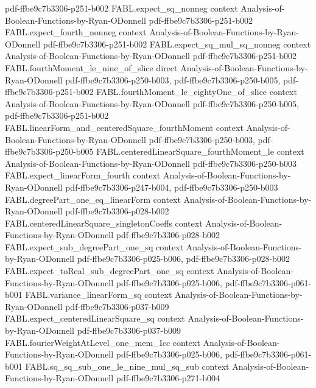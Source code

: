 \begin{theorem}
  {pdf-ffbe9c7b3306-p251-b002}
\proofstep
  {FABL.expect_sq_nonneg}
  {context}
  {Analysis-of-Boolean-Functions-by-Ryan-ODonnell}
  {pdf-ffbe9c7b3306-p251-b002}
\proofstep
  {FABL.expect_fourth_nonneg}
  {context}
  {Analysis-of-Boolean-Functions-by-Ryan-ODonnell}
  {pdf-ffbe9c7b3306-p251-b002}
\proofstep
  {FABL.expect_sq_mul_sq_nonneg}
  {context}
  {Analysis-of-Boolean-Functions-by-Ryan-ODonnell}
  {pdf-ffbe9c7b3306-p251-b002}
\proofstep
  {FABL.fourthMoment_le_nine_of_slice}
  {direct}
  {Analysis-of-Boolean-Functions-by-Ryan-ODonnell}
  {pdf-ffbe9c7b3306-p250-b003,
    pdf-ffbe9c7b3306-p250-b005,
    pdf-ffbe9c7b3306-p251-b002}
\proofstep
  {FABL.fourthMoment_le_eightyOne_of_slice}
  {context}
  {Analysis-of-Boolean-Functions-by-Ryan-ODonnell}
  {pdf-ffbe9c7b3306-p250-b005,
    pdf-ffbe9c7b3306-p251-b002}
\proofstep
  {FABL.linearForm_and_centeredSquare_fourthMoment}
  {context}
  {Analysis-of-Boolean-Functions-by-Ryan-ODonnell}
  {pdf-ffbe9c7b3306-p250-b003,
    pdf-ffbe9c7b3306-p250-b005}
\proofstep
  {FABL.centeredLinearSquare_fourthMoment_le}
  {context}
  {Analysis-of-Boolean-Functions-by-Ryan-ODonnell}
  {pdf-ffbe9c7b3306-p250-b003}
\proofstep
  {FABL.expect_linearForm_fourth}
  {context}
  {Analysis-of-Boolean-Functions-by-Ryan-ODonnell}
  {pdf-ffbe9c7b3306-p247-b004,
    pdf-ffbe9c7b3306-p250-b003}
\proofstep
  {FABL.degreePart_one_eq_linearForm}
  {context}
  {Analysis-of-Boolean-Functions-by-Ryan-ODonnell}
  {pdf-ffbe9c7b3306-p028-b002}
\proofstep
  {FABL.centeredLinearSquare_singletonCoeffs}
  {context}
  {Analysis-of-Boolean-Functions-by-Ryan-ODonnell}
  {pdf-ffbe9c7b3306-p028-b002}
\proofstep
  {FABL.expect_sub_degreePart_one_sq}
  {context}
  {Analysis-of-Boolean-Functions-by-Ryan-ODonnell}
  {pdf-ffbe9c7b3306-p025-b006,
    pdf-ffbe9c7b3306-p028-b002}
\proofstep
  {FABL.expect_toReal_sub_degreePart_one_sq}
  {context}
  {Analysis-of-Boolean-Functions-by-Ryan-ODonnell}
  {pdf-ffbe9c7b3306-p025-b006,
    pdf-ffbe9c7b3306-p061-b001}
\proofstep
  {FABL.variance_linearForm_sq}
  {context}
  {Analysis-of-Boolean-Functions-by-Ryan-ODonnell}
  {pdf-ffbe9c7b3306-p037-b009}
\proofstep
  {FABL.expect_centeredLinearSquare_sq}
  {context}
  {Analysis-of-Boolean-Functions-by-Ryan-ODonnell}
  {pdf-ffbe9c7b3306-p037-b009}
\proofstep
  {FABL.fourierWeightAtLevel_one_mem_Icc}
  {context}
  {Analysis-of-Boolean-Functions-by-Ryan-ODonnell}
  {pdf-ffbe9c7b3306-p025-b006,
    pdf-ffbe9c7b3306-p061-b001}
\proofstep
  {FABL.sq_sq_sub_one_le_nine_mul_sq_sub}
  {context}
  {Analysis-of-Boolean-Functions-by-Ryan-ODonnell}
  {pdf-ffbe9c7b3306-p271-b004}
\proofstep

\end{theorem}
